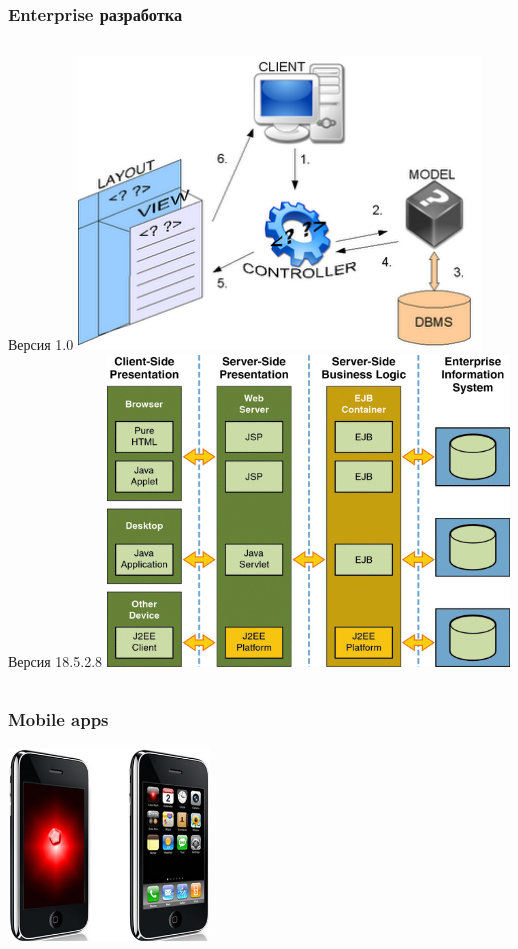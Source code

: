 \documentclass[10pt,pdf,hyperref={unicode}]{beamer}
\begin{document}
\begin{frame}
\frametitle{Enterprise разработка}

\begin{columns}
		Версия 1.0
		\includegraphics[width=0.8\textwidth]{./ruby.png}
		Версия 18.5.2.8
		\includegraphics[width=0.8\textwidth]{./enterprise.png}
\end{columns}

\end{frame}

\begin{frame}
\frametitle{ Mobile apps }
	\center
	\includegraphics[width=0.4\textwidth]{./imrich.png}
\end{frame}
\end{document}
